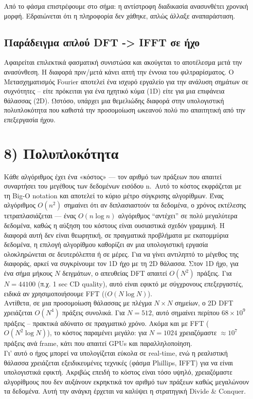 \documentclass[a4paper, 11pt]{article}
\begin{document}
Από το φάσμα επιστρέφουμε στο σήμα: η αντίστροφη διαδικασία ανασυνθέτει
χρονική μορφή. Εδραιώνεται ότι η πληροφορία δεν χάθηκε, απλώς άλλαξε
αναπαράσταση.

\subsection{Παράδειγμα απλού DFT -\textgreater{} IFFT σε
ήχο}\label{ux3c0ux3b1ux3c1ux3acux3b4ux3b5ux3b9ux3b3ux3bcux3b1-ux3b1ux3c0ux3bbux3bfux3cd-dft---ifft-ux3c3ux3b5-ux3aeux3c7ux3bf}

Αφαιρείται επιλεκτικά φασματική συνιστώσα και ακούγεται το αποτέλεσμα
μετά την ανασύνθεση. Η διαφορά πριν/μετά κάνει απτή την έννοια του
φιλτραρίσματος. Ο Μετασχηματισμός Fourier αποτελεί ένα ισχυρό εργαλείο
για την ανάλυση σημάτων σε συχνότητες -- είτε πρόκειται για ένα ηχητικό
κύμα (1D) είτε για μια επιφάνεια θάλασσας (2D). Ωστόσο, υπάρχει μια
θεμελιώδης διαφορά στην υπολογιστική πολυπλοκότητα που καθιστά την
προσομοίωση ωκεανού πολύ πιο απαιτητική από την επεξεργασία ήχου.

\section{8)
Πολυπλοκότητα}\label{ux3c0ux3bfux3bbux3c5ux3c0ux3bbux3bfux3baux3ccux3c4ux3b7ux3c4ux3b1}

Κάθε αλγόριθμος έχει ένα «κόστος» --- τον αριθμό των πράξεων που απαιτεί
συναρτήσει του μεγέθους των δεδομένων εισόδου n.~Αυτό το κόστος
εκφράζεται με τη Big-O notation και αποτελεί το κύριο μέτρο σύγκρισης
αλγορίθμων. Ένας αλγόριθμος \(O(n^2)\) σημαίνει ότι αν διπλασιαστούν τα
δεδομένα, ο χρόνος εκτέλεσης τετραπλασιάζεται --- ένας \(O(n \log n)\)
αλγόριθμος ``αντέχει'' σε πολύ μεγαλύτερα δεδομένα, καθώς η αύξηση του
κόστους είναι ουσιαστικά σχεδόν γραμμική. Η διαφορά αυτή δεν είναι
θεωρητική, σε πραγματικά προβλήματα με εκατομμύρια δεδομένα, η επιλογή
αλγορίθμου καθορίζει αν μια υπολογιστική εργασία ολοκληρώνεται σε
δευτερόλεπτα ή σε μέρες. Για να γίνει αντιληπτό το μέγεθος της διαφοράς,
αρκεί να συγκρίνουμε τον 1D ήχο με τη 2D θάλασσα. Στον 1D ήχο, για ένα
σήμα μήκους \(N\) δειγμάτων, ο απευθείας DFT απαιτεί \(O(N^2)\) πράξεις.
Για \(N=44100\) (π.χ. 1 sec CD quality), αυτό είναι εφικτό με σύγχρονους
επεξεργαστές, ειδικά αν χρησιμοποιήσουμε FFT (\((O(N \log N)\)).\\
Αντίθετα, σε μια προσομοίωση θάλασσας με πλέγμα \(N \times N\) σημείων,
ο 2D DFT χρειάζεται \(O(N^4)\) πράξεις συνολικά. Για \(N=512\), αυτό
σημαίνει περίπου \(68 \times 10^9\) πράξεις -- πρακτικά αδύνατο σε
πραγματικό χρόνο. Ακόμα και με FFT (\(O(N^2 \log N)\)), το κόστος
παραμένει μεγάλο: για \(N=1024\) χρειαζόμαστε \(\approx 10^7\) πράξεις
ανά frame, κάτι που απαιτεί GPUs και παραλληλοποίηση.\\
Γι' αυτό ο ήχος μπορεί να υπολογίζεται εύκολα σε real‑time, ενώ η
ρεαλιστική θάλασσα χρειάζεται εξειδικευμένες τεχνικές (φάσμα Phillips,
IFFT) για να είναι υπολογιστικά εφικτή. Ακριβώς επειδή το κόστος είναι
τόσο υψηλό, χρειαζόμαστε αλγορίθμους που δεν αυξάνουν εκρηκτικά τον
αριθμό των πράξεων καθώς μεγαλώνουν τα δεδομένα. Αυτή την ανάγκη έρχεται
να καλύψει η στρατηγική Divide \& Conquer.
\end{document}
